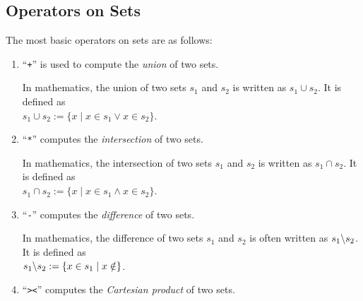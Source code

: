 \subsection{Operators on Sets}
The most basic operators on sets are as follows:
\begin{enumerate}
\item ``\texttt{+}'' is used to compute the \emph{union} of two sets.

      In mathematics, the union of two sets $s_1$ and $s_2$ is  written
      as $s_1 \cup s_2$.  It is defined as
      \\[0.2cm]
      \hspace*{1.3cm}
      $s_1 \cup s_2 := \{ x \mid x \in s_1 \vee x \in  s_2 \}$.
\item ``\texttt{*}'' computes the \emph{intersection} of two sets. 

      In mathematics, the intersection of two sets $s_1$ and $s_2$ is  written
      as $s_1 \cap s_2$.  It is defined as
      \\[0.2cm]
      \hspace*{1.3cm}
      $s_1 \cap s_2 := \{ x \mid x \in s_1 \wedge x \in  s_2 \}$.
\item ``\texttt{-}'' computes the \emph{difference} of two sets.

      In mathematics, the difference of two sets $s_1$ and $s_2$ is often written
      as $s_1 \symbol{92} s_2$.  It is defined as
      \\[0.2cm]
      \hspace*{1.3cm}
      $s_1 \symbol{92} s_2 := \{ x \in s_1 \mid x \notin \}$.
\item ``\texttt{><}'' computes the \emph{Cartesian product} of two sets.


\end{enumerate}
